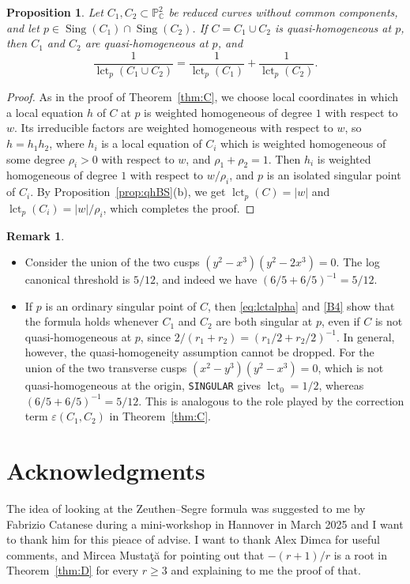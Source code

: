 \documentclass[11pt]{amsart}
\newtheorem{proposition}[theorem]{Proposition}
\theoremstyle{definition}
\newtheorem{remark}[theorem]{Remark}
\numberwithin{equation}{section}
\newcommand{\PP}{\mathbb{P}}
\newcommand{\CC}{\mathbb{C}}
\newcommand{\gadd}[1]{#1}
\newcommand{\gdel}[1]{}
\DeclareMathOperator{\Sing}{Sing}
\DeclareMathOperator{\lct}{lct}
\begin{document}
\begin{proposition}\label{prop:addBS}
Let $C_1,C_2\subset\PP^2_\CC$ be reduced curves without common components, and let $p\in\Sing(C_1)\cap\Sing(C_2)$.
If $C=C_1\cup C_2$ is quasi-homogeneous at $p$, then $C_1$ and $C_2$ are quasi-homogeneous at $p$, and
\[
\frac1{\lct_p(C_1\cup C_2)}=\frac1{\lct_p(C_1)}+\frac1{\lct_p(C_2)} .
\]
\end{proposition}

\begin{proof}
As in the proof of Theorem~\ref{thm:C}, we choose local coordinates in which a local equation $h$ of $C$ at $p$ is weighted homogeneous of degree $1$ with respect to $w$.
Its irreducible factors are weighted homogeneous with respect to $w$, so $h=h_1h_2$, where $h_i$ is a local equation of $C_i$ which is weighted homogeneous of some degree $\rho_i>0$ with respect to $w$, and $\rho_1+\rho_2=1$.
Then $h_i$ is weighted homogeneous of degree $1$ with respect to $w/\rho_i$, and $p$ is an isolated singular point of $C_i$.
By Proposition~\ref{prop:qhBS}(b), we get $\lct_p(C)=|w|$ and $\lct_p(C_i)=|w|/\rho_i$, which completes the proof.
\end{proof}

\begin{remark}\label{rem:addBS}
\begin{itemize}
\item Consider the union of the two cusps $(y^2-x^3)(y^2-2x^3)=0$. The log canonical threshold is $5/12$, and indeed we have $(6/5+6/5)^{-1}=5/12$.
\item If $p$ is an ordinary singular point of $C$, then \eqref{eq:lctalpha} and \ref{B4} show that the formula holds whenever $C_1$ and $C_2$ are both singular at $p$, even if $C$ is not quasi-homogeneous at $p$, since $2/(r_1+r_2)=(r_1/2+r_2/2)^{-1}$.
In general, however, the quasi-homogeneity assumption cannot be dropped.
For the union of the two transverse cusps $(x^2-y^3)(y^2-x^3)=0$, which is not quasi-homogeneous at the origin, \texttt{SINGULAR} gives $\lct_0=1/2$, whereas $(6/5+6/5)^{-1}=5/12$.
This is analogous to the role played by the correction term $\varepsilon(C_1,C_2)$ in Theorem~\ref{thm:C}.
\end{itemize}
\end{remark}


\section*{Acknowledgments}
The idea of looking at the Zeuthen--Segre formula was suggested to me by Fabrizio Catanese during a mini-workshop in Hannover in March 2025 and I want to thank him for this pieace of advise. I want to thank Alex Dimca for useful comments, and Mircea Musta\c{t}\u{a} for pointing out that $-(r+1)/r$ is \gdel{always} a root in Theorem~\ref{thm:D} \gadd{for every $r\ge3$} and explaining to me the proof of that.
\end{document}
